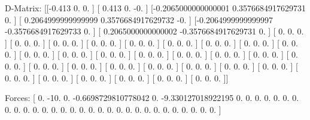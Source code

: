 D-Matrix:
[[-0.413               0.                  0.                ]
 [ 0.413               0.                 -0.                ]
 [-0.2065000000000001  0.3576684917629731  0.                ]
 [ 0.2064999999999999  0.3576684917629732 -0.                ]
 [-0.2064999999999997 -0.3576684917629733  0.                ]
 [ 0.2065000000000002 -0.3576684917629731  0.                ]
 [ 0.                  0.                  0.                ]
 [ 0.                  0.                  0.                ]
 [ 0.                  0.                  0.                ]
 [ 0.                  0.                  0.                ]
 [ 0.                  0.                  0.                ]
 [ 0.                  0.                  0.                ]
 [ 0.                  0.                  0.                ]
 [ 0.                  0.                  0.                ]
 [ 0.                  0.                  0.                ]
 [ 0.                  0.                  0.                ]
 [ 0.                  0.                  0.                ]
 [ 0.                  0.                  0.                ]
 [ 0.                  0.                  0.                ]
 [ 0.                  0.                  0.                ]
 [ 0.                  0.                  0.                ]
 [ 0.                  0.                  0.                ]
 [ 0.                  0.                  0.                ]
 [ 0.                  0.                  0.                ]
 [ 0.                  0.                  0.                ]
 [ 0.                  0.                  0.                ]
 [ 0.                  0.                  0.                ]
 [ 0.                  0.                  0.                ]
 [ 0.                  0.                  0.                ]
 [ 0.                  0.                  0.                ]
 [ 0.                  0.                  0.                ]
 [ 0.                  0.                  0.                ]
 [ 0.                  0.                  0.                ]
 [ 0.                  0.                  0.                ]
 [ 0.                  0.                  0.                ]
 [ 0.                  0.                  0.                ]]

Forces:
[  0.                 -10.                   0.
  -0.6698729810778042   0.                  -9.330127018922195
   0.                   0.                   0.
   0.                   0.                   0.
   0.                   0.                   0.
   0.                   0.                   0.
   0.                   0.                   0.
   0.                   0.                   0.
   0.                   0.                   0.
   0.                   0.                   0.
   0.                   0.                   0.
   0.                   0.                   0.                ]

